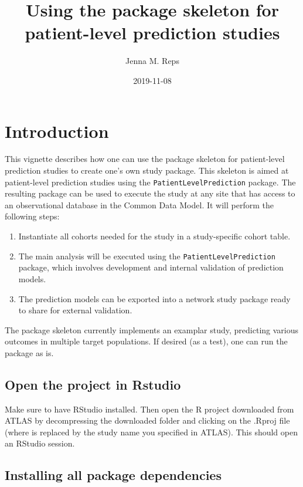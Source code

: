 \documentclass[]{article}
\title{Using the package skeleton for patient-level prediction studies}
\author{Jenna M. Reps}
\date{2019-11-08}
\providecommand{\tightlist}{%
  \setlength{\itemsep}{0pt}\setlength{\parskip}{0pt}}
\begin{document}
\maketitle

{
\setcounter{tocdepth}{2}
\tableofcontents
}
\section{Introduction}\label{introduction}

This vignette describes how one can use the package skeleton for
patient-level prediction studies to create one's own study package. This
skeleton is aimed at patient-level prediction studies using the
\texttt{PatientLevelPrediction} package. The resulting package can be
used to execute the study at any site that has access to an
observational database in the Common Data Model. It will perform the
following steps:

\begin{enumerate}
\def\labelenumi{\arabic{enumi}.}
\tightlist
\item
  Instantiate all cohorts needed for the study in a study-specific
  cohort table.
\item
  The main analysis will be executed using the
  \texttt{PatientLevelPrediction} package, which involves development
  and internal validation of prediction models.
\item
  The prediction models can be exported into a network study package
  ready to share for external validation.
\end{enumerate}

The package skeleton currently implements an examplar study, predicting
various outcomes in multiple target populations. If desired (as a test),
one can run the package as is.

\subsection{Open the project in
Rstudio}\label{open-the-project-in-rstudio}

Make sure to have RStudio installed. Then open the R project downloaded
from ATLAS by decompressing the downloaded folder and clicking on the
.Rproj file (where is replaced by the study name you specified in
ATLAS). This should open an RStudio session.

\subsection{Installing all package
dependencies}\label{installing-all-package-dependencies}
\end{document}
